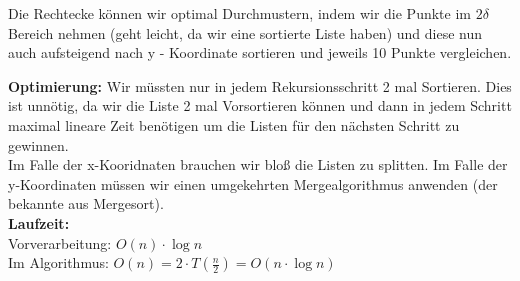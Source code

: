 Die Rechtecke können wir optimal Durchmustern, indem wir die Punkte im $2 \delta$ Bereich nehmen (geht leicht, da wir eine sortierte Liste haben) und diese nun auch aufsteigend nach y - Koordinate sortieren und jeweils 10 Punkte vergleichen.

\textbf{Optimierung:} Wir müssten nur in jedem Rekursionsschritt 2 mal Sortieren. Dies ist unnötig, da wir die Liste 2 mal Vorsortieren können und dann in jedem Schritt maximal lineare Zeit benötigen um die Listen für den nächsten Schritt zu gewinnen.\\
Im Falle der x-Kooridnaten brauchen wir bloß die Listen zu splitten. Im Falle der y-Koordinaten müssen wir einen umgekehrten Mergealgorithmus anwenden (der bekannte aus Mergesort).\\

\textbf{Laufzeit:}\\
Vorverarbeitung: $O(n) \cdot \log n$\\
Im Algorithmus: $O(n) = 2 \cdot T(\frac{n}{2}) = O (n \cdot \log n)$